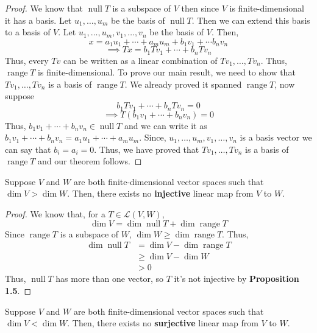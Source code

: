 \begin{proof}
    We know that $\operatorname{null} T$ is a subspace of $V$ then since $V$ is finite-dimensional it has a basis. Let $u_1,\ldots,u_m$
    be the basis of $\operatorname{null} T$. Then we can extend this basis to a basis of $V$. Let $u_1,\ldots,u_m,v_1,\ldots,v_n$ be the
    basis of $V$. Then,
    \[ x = a_1 u_1 + \cdots + a_m u_m + b_1 v_1 + \cdots b_n v_n \]
    \[ \implies Tx = b_1 Tv_1 + \cdots + b_n T v_n \]
    Thus, every $Tv$ can be written as a linear combination of $Tv_1, \ldots, Tv_n$. Thus, $\operatorname{range} T$ is finite-dimensional.
    To prove our main result, we need to show that $Tv_1, \ldots, Tv_n$ is a basis of $\operatorname{range} T$.
    We already proved it spanned $\operatorname{range}T$, now suppose 
    \[ b_1 Tv_1 + \cdots + b_n T v_n = 0 \]
    \[ \implies T(b_1v_1 + \cdots + b_n v_n ) = 0 \]
    Thus, $b_1 v_1 + \cdots + b_n  v_n \in \operatorname{null} T$ and we can write it as 
    $b_1 v_1 + \cdots + b_n v_n = a_1 u_1 + \cdots + a_m u_m$. Since, $u_1,\ldots,u_m,v_1,\ldots,v_n$ is a basis vector we can say that
    $b_i=a_i=0$. Thus, we have proved that $Tv_1, \ldots, Tv_n$ is a basis of $\operatorname{range}T$ and our theorem follows.
\end{proof}


\begin{theorem}
    Suppose $V$ and $W$ are both finite-dimensional vector spaces such that $\dim V > \dim W$. Then, there exists no \textbf{injective}
    linear map from $V$ to $W$.
\end{theorem}

\begin{proof}
    We know that, for a $T \in \mathcal{L}(V,W)$,
    \[ \dim V = \dim \operatorname{null} T + \dim \operatorname{range} T \]
    Since $\operatorname{range} T$ is a subspace of $W$, $\dim W \ge \dim \operatorname{range} T$. Thus,
    \begin{align*}
        \dim \operatorname{null} T &= \dim V - \dim \operatorname{range} T \\
        & \ge \dim V - \dim W \\
        & > 0
    \end{align*}
    Thus, $\operatorname{null} T$ has more than one vector, so $T$ it's not injective by \textbf{Proposition 1.5}.
\end{proof}

\begin{theorem}
    Suppose $V$ and $W$ are both finite-dimensional vector spaces such that $\dim V < \dim W$. Then, there exists no \textbf{surjective}
    linear map from $V$ to $W$.
\end{theorem}

